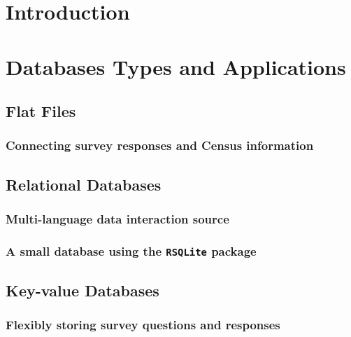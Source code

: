 \documentclass[]{article}
\begin{document}
\maketitle


\section{Introduction}

\section{Databases Types and Applications}

\subsection{Flat Files}

\subsubsection{Connecting survey responses and Census information}

\subsection{Relational Databases}

\subsubsection{Multi-language data interaction source}

\subsubsection{A small database using the \texttt{RSQLite} package}

\subsection{Key-value Databases}

\subsubsection{Flexibly storing survey questions and responses}
\end{document}
